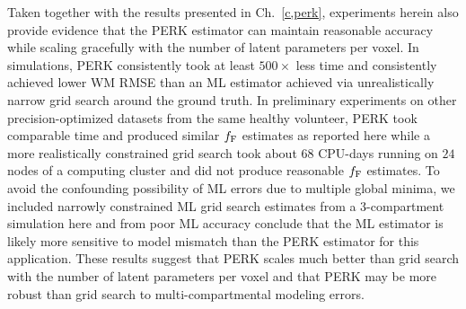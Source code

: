 Taken together with the results presented
in Ch.~\ref{c,perk},
experiments herein also provide evidence
that the PERK estimator \cite{nataraj::dfm}
can maintain reasonable accuracy
while scaling gracefully
with the number of latent parameters per voxel. 
In simulations,
PERK consistently took at least $500\times$ less time
and consistently achieved lower WM RMSE
than an ML estimator 
achieved via unrealistically narrow grid search
around the ground truth.
In preliminary experiments
on other precision-optimized \invivo datasets
from the same healthy volunteer,
PERK took comparable time 
and produced similar $f_{\mathrm{F}}$ estimates 
as reported here
while a more realistically constrained grid search
took about $68$ CPU-days 
running on $24$ nodes of a computing cluster
and did not produce reasonable $f_{\mathrm{F}}$ estimates.
To avoid the confounding possibility of \invivo ML errors
due to multiple global minima, 
we included narrowly constrained ML grid search estimates
from a 3-compartment simulation here
and from poor ML accuracy conclude
that the ML estimator is likely more sensitive 
to model mismatch than the PERK estimator
for this application.
These results suggest 
that PERK scales much better than grid search
with the number of latent parameters per voxel
and that PERK may be more robust than grid search
to multi-compartmental modeling errors.

